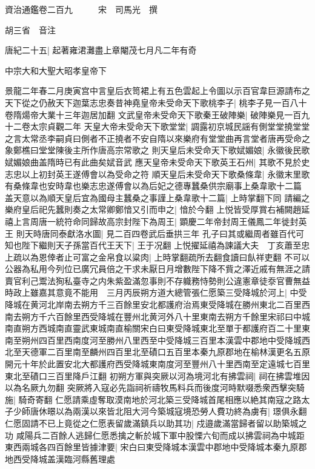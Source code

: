 資治通鑑卷二百九　　　宋　司馬光　撰

胡三省　音注

唐紀二十五|{
	起著雍涒灘盡上章閹茂七月凡二年有奇}


中宗大和大聖大昭孝皇帝下

景龍二年春二月庚寅宫中言皇后衣笥裙上有五色雲起上令圖以示百官韋巨源請布之天下從之仍赦天下迦葉志忠奏昔神堯皇帝未受命天下歌桃李子|{
	桃李子見一百八十卷隋煬帝大業十三年迦居加翻}
文武皇帝未受命天下歌秦王破陣樂|{
	破陣樂見一百九十二卷太宗貞觀二年}
天皇大帝未受命天下歌堂堂|{
	調露初京城民謡有側堂堂撓堂堂之言太常丞李嗣貞曰側者不正撓者不安自隋以來樂府有堂堂曲再言堂者唐再受命之象鄭樵曰堂堂陳後主所作唐高宗常歌之}
則天皇后未受命天下歌娬媚娘|{
	永徽後民歌娬媚娘曲盖隋時已有此曲矣娬音武}
應天皇帝未受命天下歌英王石州|{
	其歌不見於史志忠以上初封英王遂傅會以為受命之符}
順天皇后未受命天下歌桑條韋|{
	永徽末里歌有桑條韋也安時韋也樂志忠遂傅會以為后妃之德專蠶桑供宗廟事上桑韋歌十二篇}
盖天意以為順天皇后宜為國母主蠶桑之事謹上桑韋歌十二篇|{
	上時掌翻下同}
請編之樂府皇后祀先蠶則奏之太常卿鄭愔又引而申之|{
	愔於今翻}
上悦皆受厚賞右補闕趙延禧上言周唐一統符命同歸故高宗封陛下為周王|{
	顕慶二年帝封周王儀鳳二年徙封英王}
則天時唐同泰獻洛水圖|{
	見二百四卷武后垂拱三年}
孔子曰其或繼周者雖百代可知也陛下繼則天子孫當百代王天下|{
	王于况翻}
上悦擢延禧為諫議大夫　丁亥蕭至忠上疏以為恩倖者止可富之金帛食以粱肉|{
	上時掌翻疏所去翻食讀曰飤祥吏翻}
不可以公器為私用今列位已廣冗員倍之干求未厭日月增數陛下降不貲之澤近戚有無涯之請賣官利己鬻法狥私臺寺之内朱紫盈滿忽事則不存軄務恃勢則公違憲章徒沗官曹無益時政上雖嘉其意竟不能用　三月丙辰朔方道大總管張仁愿築三受降城於河上|{
	中受降城在黄河北岸南去朔方千三百餘里安北都護府治焉東受降城在勝州東北二百里西南去朔方千六百餘里西受降城在豐州北黄河外八十里東南去朔方千餘里宋祁曰中城南直朔方西城南直靈武東城南直榆關宋白曰東受降城東北至單于都護府百二十里東南至朔州四百里西南度河至勝州八里西至中受降城三百里本漢雲中郡地中受降城西北至天德軍二百里南至麟州四百里北至磧口五百里本秦九原郡地在榆林漢更名五原開元十年於此置安北大都護府西受降城東南度河至豐州八十里西南至定遠城七百里東北至磧口三百里降戶江翻}
初朔方軍與突厥以河為境河北有拂雲祠|{
	祠在拂雲堆因以為名厥九勿翻}
突厥將入寇必先詣祠祈禱牧馬料兵而後度河時默啜悉衆西擊突騎施|{
	騎奇寄翻}
仁愿請乘虛奪取漠南地於河北築三受降城首尾相應以絶其南寇之路太子少師唐休暻以為兩漢以來皆北阻大河今築城寇境恐勞人費功終為虜有|{
	璟俱永翻}
仁愿固請不已上竟從之仁愿表留歲滿鎮兵以助其功|{
	戍邉歲滿當歸者留以助築城之功}
咸陽兵二百餘人逃歸仁愿悉擒之斬於城下軍中股慄六旬而成以拂雲祠為中城距東西兩城各四百餘里皆據津要|{
	宋白曰東受降城本漢雲中郡地中受降城本秦九原郡地西受降城盖漢臨河縣舊理處}
